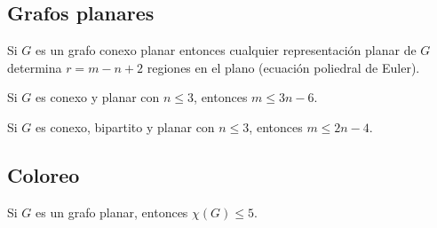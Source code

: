 \subsection{Grafos planares}

\begin{teo}[Euler, 1752]
    Si $G$ es un grafo conexo planar entonces cualquier representación planar de $G$ determina $r = m - n + 2$ regiones en el plano (ecuación poliedral de Euler).
\end{teo}

\begin{lema}
\label{planarMayor3}
    Si $G$ es conexo y planar con $n \leq 3$, entonces $m \leq 3n - 6$.
\end{lema}

\begin{lema}
\label{planarBipartitoMayor3}
    Si $G$ es conexo, bipartito y planar con $n \leq 3$, entonces $m \leq 2n - 4$.
\end{lema}


\subsection{Coloreo}

\begin{teo}[Headwood, 1890]
    Si $G$ es un grafo planar, entonces $\chi(G) \leq 5$.
\end{teo}

